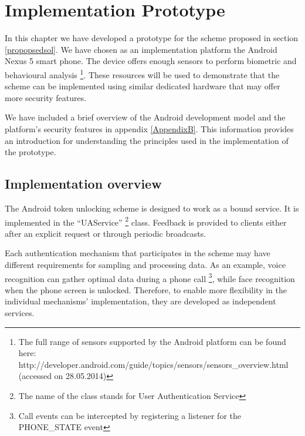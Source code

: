 
\chapter{Implementation Prototype} %

\label{Chapter5} %

In this chapter we have developed a prototype for the scheme proposed in section \ref{propopsedsol}. We have chosen as an implementation platform the Android Nexus 5 smart phone. The device offers enough sensors to perform biometric and behavioural analysis \footnote{The full range of sensors supported by the Android platform can be found here: http://developer.android.com/guide/topics/sensors/sensors\_overview.html (accessed on 28.05.2014)}. These resources will be used to demonstrate that the scheme can be implemented using similar dedicated hardware that may offer more security features.

We have included a brief overview of the Android development model and the platform's security features in appendix \ref{AppendixB}. This information provides an introduction for understanding the principles used in the implementation of the prototype.

\section{Implementation overview}
\label{impleoverview}
The Android token unlocking scheme is designed to work as a bound service. It is implemented in the ``UAService'' \footnote{The name of the class stands for User Authentication Service} class. Feedback is provided to clients either after an explicit request or through periodic broadcasts.

Each authentication mechanism that participates in the scheme may have different requirements for sampling and processing data. As an example, voice recognition can gather optimal data during a phone call \footnote{Call events can be intercepted by registering a listener for the PHONE\_STATE event}, while face recognition when the phone screen is unlocked. Therefore, to enable more flexibility in the individual mechanisms' implementation, they are developed as independent services.

